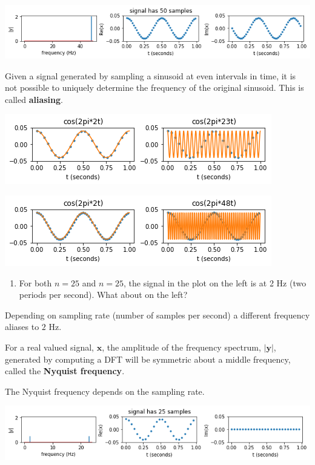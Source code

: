 \documentclass[12pt,letterpaper,noanswers]{exam}
\newcommand{\vc}[1]{\boldsymbol{#1}}
\begin{document}
\includegraphics[width=0.9\linewidth]{img/C21ex3.png}



\begin{tcolorbox}
Given a signal generated by sampling a sinusoid at even intervals in time, it is not possible to uniquely determine the frequency of the original sinusoid.  This is called \textbf{aliasing}.  
\end{tcolorbox}

\includegraphics[width=0.7\linewidth]{img/C21alias.png}

\includegraphics[width=0.7\linewidth]{img/C21alias50.png}

\begin{enumerate}[resume=classQ]
    \item For both $n=25$ and $n=25$, the signal in the plot on the left is at 2 Hz (two periods per second).  What about on the left?
    \vspace{1cm}
\end{enumerate}

\noindent Depending on sampling rate (number of samples per second) a different frequency aliases to $2$ Hz.

\begin{tcolorbox}
For a real valued signal, $\vc{x}$, the amplitude of the frequency spectrum, $\vert\vc{y}\vert$, generated by computing a DFT will be symmetric about a middle frequency, called the \textbf{Nyquist frequency}.

The Nyquist frequency depends on the sampling rate.
\end{tcolorbox}

\includegraphics[width=0.9\linewidth]{img/C21ex2a.png}
\end{document}
